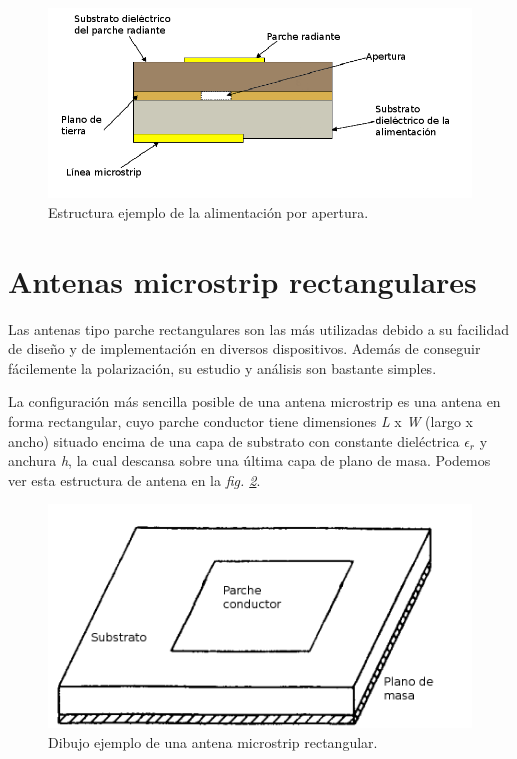 \begin{figure}[!htb]
    \centering
    \includegraphics[scale=0.45]{./ContextoTecnologico/apertura}
    \caption{Estructura ejemplo de la alimentación por apertura.}
    \label{fig:fig2.6}
\end{figure}


\section{Antenas microstrip rectangulares}\label{rectangular}

Las antenas tipo parche rectangulares son las más utilizadas debido a su facilidad de diseño y de implementación en diversos dispositivos. Además de conseguir fácilemente la polarización, su estudio y análisis son bastante simples.

La configuración más sencilla posible de una antena microstrip es una antena en forma rectangular, cuyo parche conductor tiene dimensiones \textit{L} x \textit{W} (largo x ancho) situado encima de una capa de substrato con constante dieléctrica $\epsilon_r$ y anchura \textit{h}, la cual descansa sobre una última capa de plano de masa. Podemos ver esta estructura de antena en la \textit{fig. \ref{fig:fig2.7}}.

\begin{figure}[!htb]
    \centering
    \includegraphics[scale=0.25]{./ContextoTecnologico/antena_rectangular}
    \caption{Dibujo ejemplo de una antena microstrip rectangular.}
    \label{fig:fig2.7}
\end{figure}

